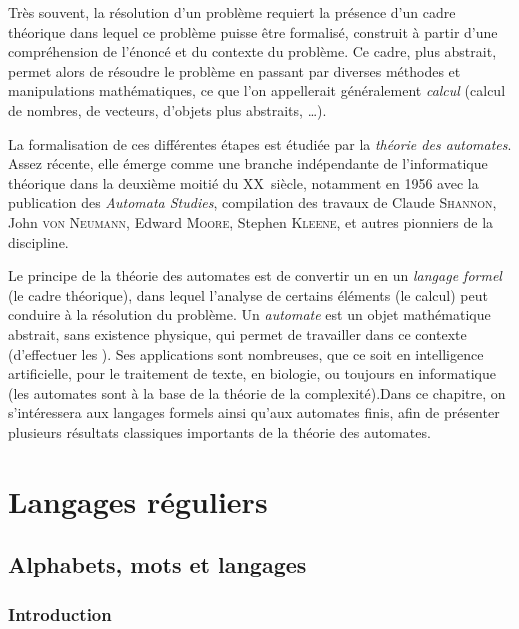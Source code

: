     Très souvent, la résolution d'un problème requiert la présence d'un cadre théorique dans lequel ce problème puisse être formalisé, construit à
    partir d'une compréhension de l'énoncé et du contexte du problème. Ce cadre, plus abstrait, permet alors de résoudre le problème en passant par
    diverses méthodes et manipulations mathématiques, ce que l'on appellerait généralement \emph{calcul} (calcul de nombres, de vecteurs, d'objets
    plus abstraits, \dots).\medskip
    
    La formalisation de ces différentes étapes est étudiée par la \emph{théorie des automates}. Assez récente, elle émerge comme une branche
    indépendante de l'informatique théorique dans la deuxième moitié du \textsc{XX}\ieme~siècle, notamment en 1956 avec la publication des
    \emph{Automata Studies}, compilation des travaux de Claude \textsc{Shannon}, John \textsc{von Neumann}, Edward \textsc{Moore}, Stephen
    \textsc{Kleene}, et autres pionniers de la discipline.\medskip
    
    Le principe de la théorie des automates est de convertir un  en un \emph{langage formel} (le cadre théorique), dans lequel
    l'analyse de certains éléments (le calcul) peut conduire à la résolution du problème. Un \emph{automate} est un objet mathématique abstrait,
    sans existence physique, qui permet de travailler dans ce contexte (\ie d'effectuer les ).  Ses applications sont nombreuses,
    que ce soit en intelligence artificielle, pour le traitement de texte, en biologie, ou toujours en informatique (les automates sont à la base
    de la théorie de la complexité).Dans ce chapitre, on s'intéressera aux langages formels ainsi qu'aux automates finis, afin de présenter
    plusieurs résultats classiques importants de la théorie des automates.\bigskip
    
    \chaptertoc
    
    \section{Langages réguliers}
    
    \subsection{Alphabets, mots et langages}
    
    \subsubsection{Introduction}
    
